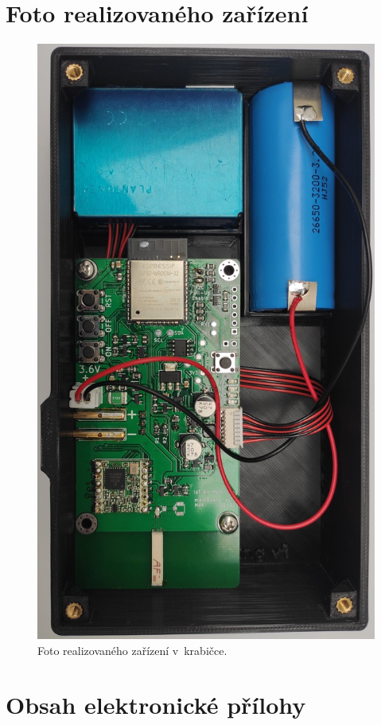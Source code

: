 \chapter{Foto realizovaného zařízení}
\begin{figure}[h]
    \centering
    \includegraphics[height=0.7\textheight]{obrazky/finalDevice.jpg}
    \caption{Foto realizovaného zařízení v~krabičce.}
    \label{fig_finalDevice}
\end{figure}

\chapter{Obsah elektronické přílohy}

